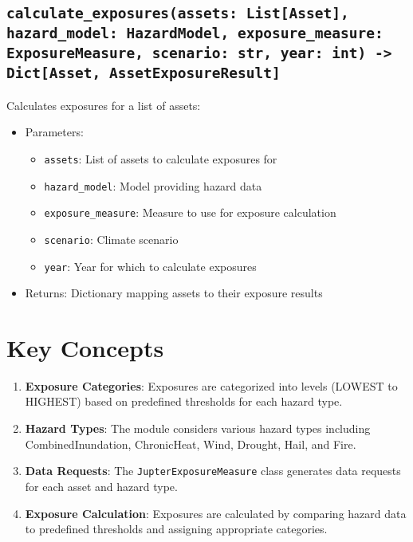 \documentclass{article}
\begin{document}
\subsection{\texttt{calculate\_exposures(assets: List[Asset], hazard\_model: HazardModel, exposure\_measure: ExposureMeasure, scenario: str, year: int) -> Dict[Asset, AssetExposureResult]}}
Calculates exposures for a list of assets:
\begin{itemize}
    \item Parameters:
    \begin{itemize}
        \item \texttt{assets}: List of assets to calculate exposures for
        \item \texttt{hazard\_model}: Model providing hazard data
        \item \texttt{exposure\_measure}: Measure to use for exposure calculation
        \item \texttt{scenario}: Climate scenario
        \item \texttt{year}: Year for which to calculate exposures
    \end{itemize}
    \item Returns: Dictionary mapping assets to their exposure results
\end{itemize}

\section{Key Concepts}

\begin{enumerate}
    \item \textbf{Exposure Categories}: Exposures are categorized into levels (LOWEST to HIGHEST) based on predefined thresholds for each hazard type.

    \item \textbf{Hazard Types}: The module considers various hazard types including CombinedInundation, ChronicHeat, Wind, Drought, Hail, and Fire.

    \item \textbf{Data Requests}: The \texttt{JupterExposureMeasure} class generates data requests for each asset and hazard type.

    \item \textbf{Exposure Calculation}: Exposures are calculated by comparing hazard data to predefined thresholds and assigning appropriate categories.
\end{enumerate}
\end{document}
